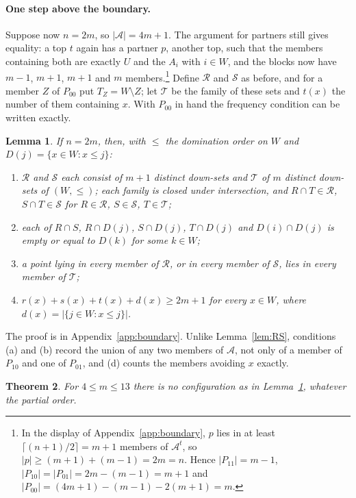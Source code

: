 \documentclass[aps,prd,twocolumn,superscriptaddress,nofootinbib,longbibliography,floatfix,amsmath,amssymb,10pt]{revtex4-2}
\theoremstyle{plain}
\newtheorem{theorem}{Theorem}[section]
\newtheorem{lemma}[theorem]{Lemma}
\theoremstyle{definition}
\theoremstyle{plain}
\newcommand{\cA}{\mathcal{A}}
\begin{document}
\paragraph*{One step above the boundary.} Suppose now $n=2m$, so $|\cA|=4m+1$. The argument for partners still gives equality: a top $t$ again has a partner $p$, another top, such that the members containing both are exactly $U$ and the $A_i$ with $i\in W$, and the blocks now have $m-1$, $m+1$, $m+1$ and $m$ members.\footnote{In the display of Appendix~\ref{app:boundary}, $p$ lies in at least $\lceil (n+1)/2\rceil=m+1$ members of $\cA^t$, so $|p|\ge(m+1)+(m-1)=2m=n$. Hence $|P_{11}|=m-1$, $|P_{10}|=|P_{01}|=2m-(m-1)=m+1$ and $|P_{00}|=(4m+1)-(m-1)-2(m+1)=m$.} Define $\mathcal R$ and $\mathcal S$ as before, and for a member $Z$ of $P_{00}$ put $T_Z=W\setminus Z$; let $\mathcal T$ be the family of these sets and $t(x)$ the number of them containing $x$. With $P_{00}$ in hand the frequency condition can be written exactly.

\begin{lemma}\label{lem:RST}
If $n=2m$, then, with $\le$ the domination order on $W$ and $D(j)=\{x\in W:x\le j\}$:
\begin{enumerate}
\item[(a)] $\mathcal R$ and $\mathcal S$ each consist of $m+1$ distinct down-sets and $\mathcal T$ of $m$ distinct down-sets of $(W,\le)$; each family is closed under intersection, and $R\cap T\in\mathcal R$, $S\cap T\in\mathcal S$ for $R\in\mathcal R$, $S\in\mathcal S$, $T\in\mathcal T$;
\item[(b)] each of $R\cap S$, $R\cap D(j)$, $S\cap D(j)$, $T\cap D(j)$ and $D(i)\cap D(j)$ is empty or equal to $D(k)$ for some $k\in W$;
\item[(c)] a point lying in every member of $\mathcal R$, or in every member of $\mathcal S$, lies in every member of $\mathcal T$;
\item[(d)] $r(x)+s(x)+t(x)+d(x)\ge 2m+1$ for every $x\in W$, where $d(x)=|\{j\in W:x\le j\}|$.
\end{enumerate}
\end{lemma}

The proof is in Appendix~\ref{app:boundary}. Unlike Lemma~\ref{lem:RS}, conditions (a) and (b) record the union of any two members of $\cA$, not only of a member of $P_{10}$ and one of $P_{01}$, and (d) counts the members avoiding $x$ exactly.

\begin{theorem}\label{thm:sat53}
For $4\le m\le 13$ there is no configuration as in Lemma~\ref{lem:RST}, whatever the partial order.
\end{theorem}
\end{document}
